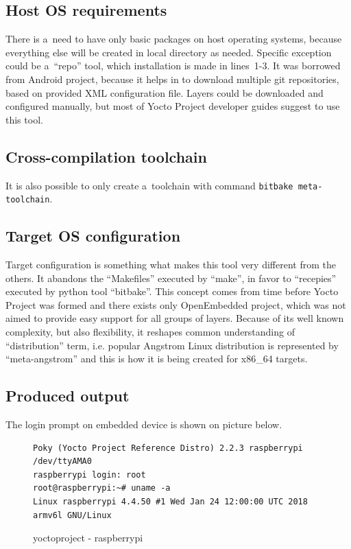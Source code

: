 \documentclass[printmode]{mgr}
\begin{document}
\subsection*{Host OS requirements}

There is a~need to have only basic packages on host operating systems, because everything else will be created in local directory as needed.
Specific exception could be a~``repo'' tool, which installation is made in lines~1-3.
It was borrowed from Android project, because it helps in to download multiple git repositories, based on provided XML configuration file.
Layers could be downloaded and configured manually, but most of Yocto Project developer guides suggest to use this tool.

\subsection*{Cross-compilation toolchain}
It is also possible to only create a~toolchain with command \verb|bitbake meta-toolchain|.

\subsection*{Target OS configuration}
Target configuration is something what makes this tool very different from the others.
It abandons the ``Makefiles'' executed by ``make'', in favor to ``recepies'' executed by python tool ``bitbake''.
This concept comes from time before Yocto Project was formed and there exists only OpenEmbedded project, which was not aimed to provide easy support for all groups of layers.
Because of its well known complexity, but also flexibility, it reshapes common understanding of ``distribution'' term, i.e. popular Angstrom Linux distribution is represented by ``meta-angstrom'' and this is how it is being created for x86\_64 targets.

\subsection*{Produced output}
The login prompt on embedded device is shown on picture below.


\begin{figure}
    \centering
\begin{verbatim}
Poky (Yocto Project Reference Distro) 2.2.3 raspberrypi /dev/ttyAMA0
raspberrypi login: root
root@raspberrypi:~# uname -a
Linux raspberrypi 4.4.50 #1 Wed Jan 24 12:00:00 UTC 2018 armv6l GNU/Linux
\end{verbatim}
    \caption{yoctoproject - raspberrypi}
\end{figure}
\end{document}
